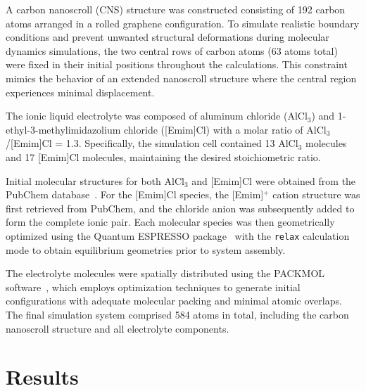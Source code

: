 \documentclass[aps,twocolumn,secnumarabic,nobalancelastpage,amsmath,amssymb,
nofootinbib,floatfix]{revtex4}
\begin{document}
A carbon nanoscroll (CNS) structure was constructed consisting of 192 carbon atoms arranged in a rolled graphene configuration. To simulate realistic boundary conditions and prevent unwanted structural deformations during molecular dynamics simulations, the two central rows of carbon atoms (63 atoms total) were fixed in their initial positions throughout the calculations. This constraint mimics the behavior of an extended nanoscroll structure where the central region experiences minimal displacement.

The ionic liquid electrolyte was composed of aluminum chloride (AlCl$_3$) and 1-ethyl-3-methylimidazolium chloride ([Emim]Cl) with a molar ratio of AlCl$_3$/[Emim]Cl = 1.3. Specifically, the simulation cell contained 13 AlCl$_3$ molecules and 17 [Emim]Cl molecules, maintaining the desired stoichiometric ratio.

Initial molecular structures for both AlCl$_3$ and [Emim]Cl were obtained from the PubChem database~\cite{pubchem}. For the [Emim]Cl species, the [Emim]$^+$ cation structure was first retrieved from PubChem, and the chloride anion was subsequently added to form the complete ionic pair. Each molecular species was then geometrically optimized using the Quantum ESPRESSO package~\cite{qe} with the \texttt{relax} calculation mode to obtain equilibrium geometries prior to system assembly.

The electrolyte molecules were spatially distributed using the PACKMOL software~\cite{packmol}, which employs optimization techniques to generate initial configurations with adequate molecular packing and minimal atomic overlaps. The final simulation system comprised 584 atoms in total, including the carbon nanoscroll structure and all electrolyte components.


\section{Results}
\end{document}
